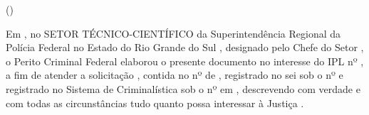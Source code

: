 \noindent\textbf{\MakeUppercase{\pfdocnamenum}}

\begin{center}
	\bigskip
	\textbf{\MakeUppercase{\pfdoctitle}}
	
	\ifx\pfdocsubtitle\empty
	\else
		(\MakeUppercase{\pfdocsubtitle})
	\fi
\end{center}

\bigskip

Em \pfdocdate\space
\unskip,
no SETOR TÉCNICO-CIENTÍFICO 
da Superintendência Regional da Polícia Federal 
no Estado do Rio Grande do Sul
\unskip,
designado pelo Chefe do Setor
\unskip,
o Perito Criminal Federal \MakeUppercase{\pfauthor}\space 
elaborou o presente documento
\ifx\pfipl\empty\else
no interesse do IPL nº \pfipl\space
\fi
\unskip,
a fim de atender a solicitação \pfclient\space
\unskip,
contida no \pfexptype\space nº \pfexpnum\space de \pfexpdate\space
\ifx\pfsei\empty\else
\unskip,
registrado no sei sob o nº \pfsei\space
\fi
\space e 
registrado no Sistema de Criminalística sob o nº \pfregnum\space em \pfregdate\space
\unskip,
descrevendo com verdade e com todas as circunstâncias tudo quanto possa interessar à Justiça
\unskip.

